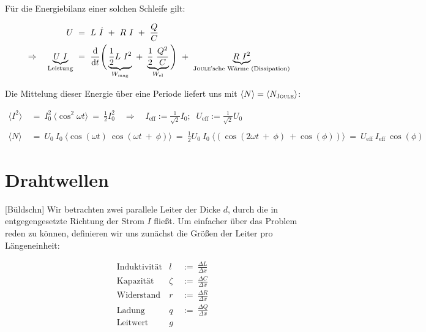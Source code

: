 Für die Energiebilanz einer solchen Schleife gilt:

\begin{align*}
U  \ &= \ L \ \dot{I} \ + \ R \ I \ + \ \frac{Q}{C}\\
\Rightarrow\quad \underbrace{U \ I}_{\text{Leistung}} \ &= \ \diff{}{t} \Bigg( \underbrace{\frac{1}{2}L \ I^2}_{W_{\text{mag}}} \ + \ \underbrace{\frac{1}{2} \ \frac{Q^2}{C}}_{W_{\text{el}}}\Bigg) \ + \ \underbrace{R \ I^2}_{\text{\textsc{Joule}'sche Wärme (Dissipation)}} 
\end{align*}

Die Mittelung dieser Energie über eine Periode liefert uns mit $\langle N \rangle = \langle N_{\textsc{Joule}} \rangle$:

\begin{align*}
\langle I^2 \rangle \ &= \ I_0^2 \ \langle\cos^2\omega t \rangle  \ = \  \frac{1}{2}I_0^2 \quad \Rightarrow\quad I_{\text{eff}} := \frac{1}{\sqrt{2}}I_0; \; \; U_{\text{eff}}:= \frac{1}{\sqrt{2}}U_0\\
\ \\
\langle N \rangle  \ &= \ U_0 \ I_0 \ \Big\langle\cos (\omega t) \ \cos(\omega t \ + \ \phi) \Big\rangle  \ = \  \frac{1}{2}U_0 \ I_0 \ \Big\langle\left(\cos(2\omega t \ + \ \phi) \ + \cos (\phi)\right)\Big\rangle  \ = \ U_{\text{eff}} \ I_{\text{eff}} \ \cos(\phi)
\end{align*}


\section{Drahtwellen}

[Büldschn]
Wir betrachten zwei parallele Leiter der Dicke $d$, durch die in entgegengesetzte Richtung der Strom $I$ fließt. Um einfacher über das Problem reden zu können, definieren wir uns zunächst die Größen der Leiter pro Längeneinheit:

\begin{align*}
&\text{Induktivität}  & l \ &:= \ \frac{\Delta L}{\Delta x}\\
&\text{Kapazität}   & \zeta  \ &:= \ \frac{\Delta C}{\Delta x}\\
&\text{Widerstand}   & r  \ &:= \ \frac{\Delta R}{\Delta x}\\
&\text{Ladung}   &q \ &:= \ \frac{\Delta Q}{\Delta x}\\
&\text{Leitwert}   &g   
\end{align*}
\ \\


